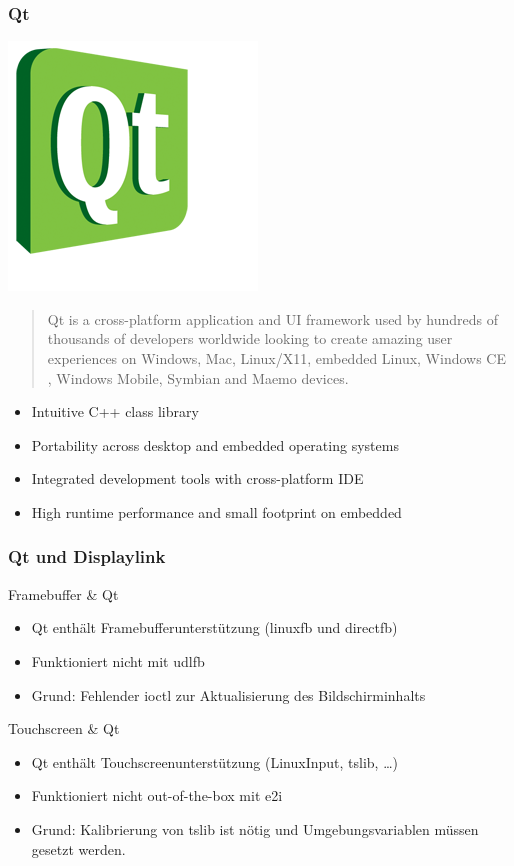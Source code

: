 \documentclass{beamer}
\begin{document}
	\begin{frame}
		\frametitle{Qt}
		\begin{floatingfigure}[l]{1.75cm}
			\includegraphics[scale=0.3]{img/qt-logo}
		\end{floatingfigure}
		\begin{quote}
		Qt is a cross-platform application  and UI framework used by hundreds of thousands of developers worldwide looking to create amazing user experiences  on Windows, Mac, Linux/X11, embedded Linux, Windows CE , Windows Mobile, Symbian  and Maemo devices.
		\end{quote}
    \begin{itemize}
      \item Intuitive C++ class library
      \item Portability across desktop and embedded operating systems
      \item Integrated development tools with cross-platform IDE
      \item High runtime performance and small footprint on embedded
    \end{itemize}
	\end{frame}	
	
	\begin{frame}
		\frametitle{Qt und Displaylink}
    \begin{block}{Framebuffer \& Qt}
      \begin{itemize}
        \item Qt enthält Framebufferunterstützung (linuxfb und directfb)
        \item Funktioniert nicht mit udlfb
        \item Grund: Fehlender ioctl zur Aktualisierung des Bildschirminhalts
      \end{itemize}
    \end{block}
    \begin{block}{Touchscreen \& Qt}
        \begin{itemize}
          \item Qt enthält Touchscreenunterstützung (LinuxInput, tslib, \ldots)
          \item Funktioniert nicht out-of-the-box mit e2i
          \item Grund: Kalibrierung von tslib ist nötig und Umgebungsvariablen müssen gesetzt
            werden.
        \end{itemize}
    \end{block}
	\end{frame}
	
\end{document}
